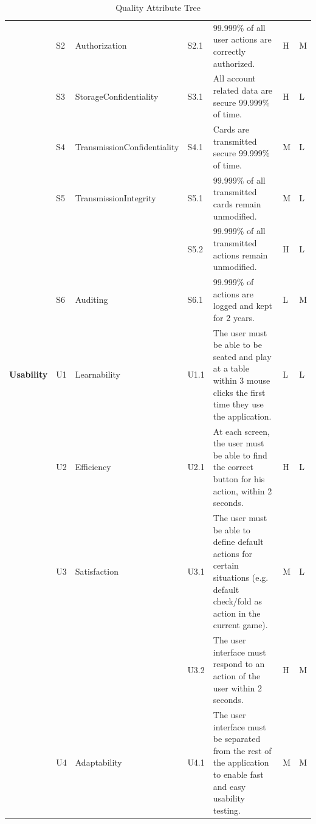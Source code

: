 \documentclass[a4paper,11pt]{report}
\begin{document}
\begin{table}[htpb]
\begin{center}
\begin{tabular}{| p{} | p{0.25cm}  p{2.5cm} | p{0.55cm}  p{7cm} | p{} | p{} | }
			& S2 & Authorization 	& S2.1 & 99.999\% of all user actions are correctly authorized. & H & M  \\\cline{2-7}
			& S3 & Storage\newline Confidentiality & S3.1 & All account related data are secure 99.999\% of time. & H & L   \\\cline{2-7}
			& S4 & Transmission\newline Confidentiality & S4.1 & Cards are transmitted secure 99.999\% of time. & M & L  \\\cline{2-7}
			& S5 & Transmission\newline Integrity & S5.1 & 99.999\% of all transmitted cards remain unmodified. & M & L  \\\cline{4-7}
			& &			& S5.2 & 99.999\% of all transmitted actions remain unmodified. & H & L  \\\cline{2-7}
			& S6 & Auditing 		& S6.1 & 99.999\% of actions are logged and kept for 2 years. & L & M  \\\hline
\textbf{Usability} 	& U1 & Learnability & U1.1  & The user must be able to be seated and play at a table within 3 mouse clicks the first time they use the application. & L & L  \\\cline{2-7}
			&U2 &Efficiency			&U2.1  &At each screen, the user must be able to find the correct button for his action, within 2 seconds. & H & L  \\\cline{2-7}
			&U3 &Satisfaction			&U3.1  &The user must be able to define default actions for certain situations (e.g. default check/fold as action in the current game).& M & L  \\\cline{4-7}
			& &			&U3.2  &The user interface must respond to an action of the user within 2 seconds. & H & M  \\\cline{2-7}
			&U4 &Adaptability			&U4.1  &The user interface must be separated from the rest of the application to enable fast and easy usability testing. & M & M  \\\hline

\end{tabular}
\end{center}
\caption{Quality Attribute Tree}
\label{QAT}
\end{table}
\end{document}
